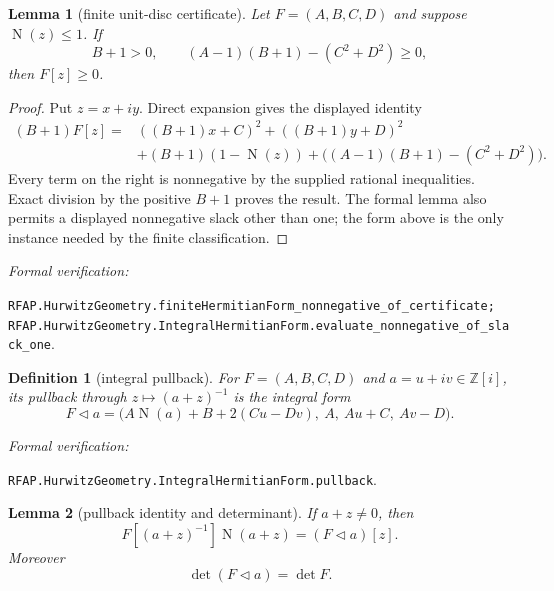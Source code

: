 \documentclass[11pt]{article}
\newtheorem{lemma}[lemma]{Lemma}
\newtheorem{definition}[definition]{Definition}
\newcommand{\Zi}{\mathbb{Z}[i]}
\newcommand{\Norm}[1]{\operatorname{N}\!\left(#1\right)}
\newcommand{\leanref}[1]{\par\smallskip\noindent
  \emph{Formal verification:}\par\nobreak
  {\raggedright\nolinkurl{#1}.\par}}
\begin{document}
\begin{lemma}[finite unit-disc certificate]
\label{lem:hermitian-slack-certificate}
Let $F=(A,B,C,D)$ and suppose $\Norm z\le1$.  If
\begin{equation}
\label{eq:slack-one-certificate}
                  B+1>0,
 \qquad (A-1)(B+1)-(C^2+D^2)\ge0,
\end{equation}
then $F[z]\ge0$.
\end{lemma}

\begin{proof}
Put $z=x+iy$.  Direct expansion gives the displayed identity
\begin{align*}
 (B+1)F[z]
   ={}&((B+1)x+C)^2+((B+1)y+D)^2\\
     &+(B+1)(1-\Norm z)
       +\bigl((A-1)(B+1)-(C^2+D^2)\bigr).
\end{align*}
Every term on the right is nonnegative by the supplied rational
inequalities.  Exact division by the positive $B+1$ proves the result.  The
formal lemma also permits a displayed nonnegative slack other than one; the
form above is the only instance needed by the finite classification.
\end{proof}

\leanref{RFAP.HurwitzGeometry.finiteHermitianForm_nonnegative_of_certificate;
RFAP.HurwitzGeometry.IntegralHermitianForm.evaluate_nonnegative_of_slack_one}

\begin{definition}[integral pullback]
\label{def:hermitian-pullback}
For $F=(A,B,C,D)$ and $a=u+iv\in\Zi$, its pullback through
$z\mapsto(a+z)^{-1}$ is the integral form
\begin{equation}
\label{eq:hermitian-pullback-coefficients}
 F\mathbin{\triangleleft}a=
 \bigl(A\Norm a+B+2(Cu-Dv),\ A,\ Au+C,\ Av-D\bigr).
\end{equation}
\end{definition}

\leanref{RFAP.HurwitzGeometry.IntegralHermitianForm.pullback}

\begin{lemma}[pullback identity and determinant]
\label{lem:hermitian-pullback}
If $a+z\ne0$, then
\begin{equation}
\label{eq:hermitian-pullback}
 F[(a+z)^{-1}]\Norm{a+z}=(F\mathbin{\triangleleft}a)[z].
\end{equation}
Moreover
\begin{equation}
\label{eq:pullback-determinant}
                 \det(F\mathbin{\triangleleft}a)=\det F.
\end{equation}
\end{lemma}
\end{document}
